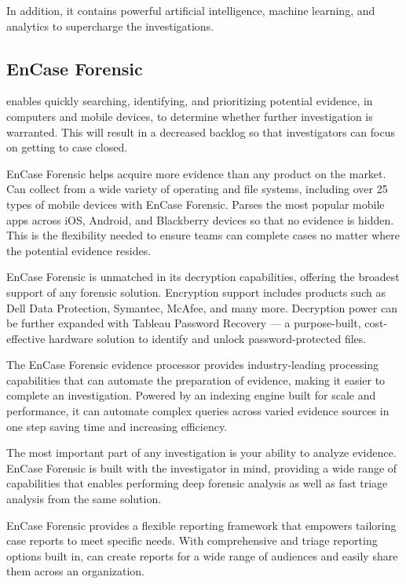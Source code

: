 In addition, it contains powerful artificial intelligence, machine learning, and analytics to supercharge the investigations. 

\subsection{EnCase Forensic}

 \cite{encase} enables quickly searching, identifying, and prioritizing potential evidence, in computers and mobile devices, to determine whether 
further investigation is warranted. This will result in a decreased backlog so that investigators can focus on getting to case closed. 

EnCase Forensic helps acquire more evidence than any product on the market. Can collect from a wide variety of operating and file systems, 
including over 25 types of mobile devices with EnCase Forensic. Parses the most popular mobile apps across iOS, Android, and Blackberry devices so that 
no evidence is hidden. This is the flexibility needed to ensure teams can complete cases no matter where the potential evidence resides.

EnCase Forensic is unmatched in its decryption capabilities, offering the broadest support of any forensic solution. Encryption support includes products 
such as Dell Data Protection, Symantec, McAfee, and many more. Decryption power can be further expanded with Tableau Password 
Recovery — a purpose-built, cost-effective hardware solution to identify and unlock password-protected files. 

The EnCase Forensic evidence processor provides industry-leading processing capabilities that can automate the preparation of evidence, making 
it easier to complete an investigation. Powered by an indexing engine built for scale and performance, it can automate complex queries across 
varied evidence sources in one step saving time and increasing efficiency. 

The most important part of any investigation is your ability to analyze evidence. EnCase Forensic is built with the investigator in mind, 
providing a wide range of capabilities that enables performing deep forensic analysis as well as fast triage analysis from the same solution. 

EnCase Forensic provides a flexible reporting framework that empowers tailoring case reports to meet specific needs. With comprehensive 
and triage reporting options built in, can create reports for a wide range of audiences and easily share them across an organization. 

